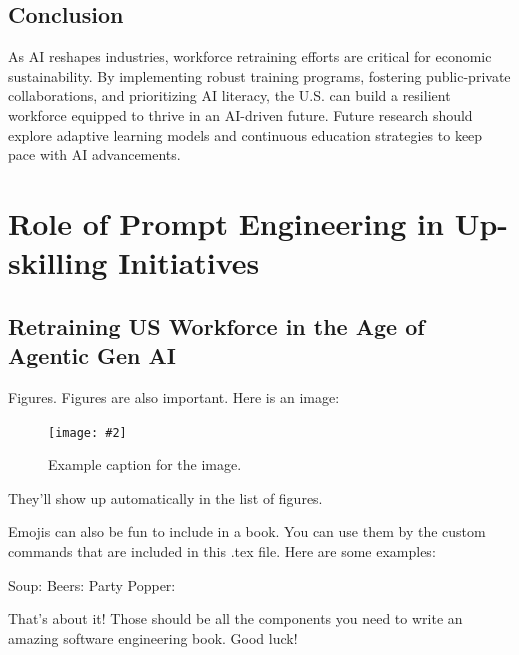 \documentclass[a4paper,headinclude=on,footinclude=on,12pt,oneside]{scrbook}
\newcommand{\standardfigure}[3]{\begin{figure}[H]\begin{center}\texttt{[image: \#2]}\caption{#3}\label{fig:#2}\end{center}\end{figure}}
\begin{document}
\section{Conclusion}

As AI reshapes industries, workforce retraining efforts are critical for economic sustainability. By implementing robust training programs, fostering public-private collaborations, and prioritizing AI literacy, the U.S. can build a resilient workforce equipped to thrive in an AI-driven future. Future research should explore adaptive learning models and continuous education strategies to keep pace with AI advancements.



\chapter{ Role of Prompt Engineering in Up-skilling Initiatives}

\section{Retraining US Workforce in the Age of Agentic Gen AI}



Figures. Figures are also important. Here is an image:

\standardfigure{\textwidth/2}{folder-one/example}{Example caption for the image.}

They'll show up automatically in the list of figures.


Emojis can also be fun to include in a book. You can use them by the custom commands that are included in this .tex file. Here are some examples:

Soup: \soup
Beers: \beers
Party Popper: \partypopper

That's about it! Those should be all the components you need to write an amazing software engineering book. Good luck!
\end{document}
